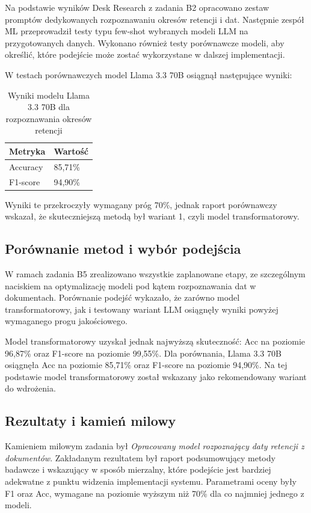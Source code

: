 \documentclass[12pt,a4paper]{report}
\begin{document}
Na podstawie wyników Desk Research z zadania B2 opracowano zestaw promptów dedykowanych rozpoznawaniu okresów retencji i dat. Następnie zespół ML przeprowadził testy typu few-shot wybranych modeli LLM na przygotowanych danych. Wykonano również testy porównawcze modeli, aby określić, które podejście może zostać wykorzystane w dalszej implementacji.

W testach porównawczych model Llama 3.3 70B osiągnął następujące wyniki:

\begin{table}[h]
    \centering
    \caption{Wyniki modelu Llama 3.3 70B dla rozpoznawania okresów retencji}
    \begin{tabular}{l l}
        \toprule
        Metryka & Wartość \\
        \midrule
        Accuracy & 85{,}71\% \\
        F1-score & 94{,}90\% \\
        \bottomrule
    \end{tabular}
\end{table}

Wyniki te przekroczyły wymagany próg 70\%, jednak raport porównawczy wskazał, że skuteczniejszą metodą był wariant 1, czyli model transformatorowy.

\subsection{Porównanie metod i wybór podejścia}
W ramach zadania B5 zrealizowano wszystkie zaplanowane etapy, ze szczególnym naciskiem na optymalizację modeli pod kątem rozpoznawania dat w dokumentach. Porównanie podejść wykazało, że zarówno model transformatorowy, jak i testowany wariant LLM osiągnęły wyniki powyżej wymaganego progu jakościowego.

Model transformatorowy uzyskał jednak najwyższą skuteczność: Acc na poziomie 96{,}87\% oraz F1-score na poziomie 99{,}55\%. Dla porównania, Llama 3.3 70B osiągnęła Acc na poziomie 85{,}71\% oraz F1-score na poziomie 94{,}90\%. Na tej podstawie model transformatorowy został wskazany jako rekomendowany wariant do wdrożenia.

\subsection{Rezultaty i kamień milowy}
Kamieniem milowym zadania był \textit{Opracowany model rozpoznający daty retencji z dokumentów}. Zakładanym rezultatem był raport podsumowujący metody badawcze i wskazujący w sposób mierzalny, które podejście jest bardziej adekwatne z punktu widzenia implementacji systemu. Parametrami oceny były F1 oraz Acc, wymagane na poziomie wyższym niż 70\% dla co najmniej jednego z modeli.
\end{document}
